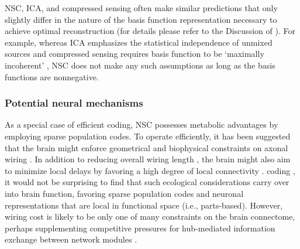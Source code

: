 \ac{NSC}, \ac{ICA}, and compressed sensing often make similar predictions
that only slightly differ in the nature of the basis function representation
necessary to achieve optimal reconstruction
(for details please refer to the Discussion of \cite{GanguliSompolinsky2012}).
For example, whereas \ac{ICA} emphasizes the statistical independence 
of unmixed sources
and compressed sensing requires basis function to be `maximally incoherent'
\cite{GanguliSompolinsky2012},
\ac{NSC} does not make any such assumptions
as long as the basis functions are nonnegative.


\subsubsection*{Potential neural mechanisms}

As a special case of efficient coding,
\ac{NSC} possesses metabolic advantages by employing
sparse population codes.
To operate efficiently, it has been suggested that the brain might enforce 
geometrical and biophysical constraints on axonal wiring 
\cite{LaughlinSejnowski2003}.
In addition to reducing overall wiring length
\cite{Cherniak1994}, the brain might also aim to minimize local delays
by favoring a high degree of local connectivity
\cite{Chklovskii2002}.
 coding \cite{Clopath2010},
it would not be surprising to find that such ecological considerations
carry over into brain function,
favoring sparse population codes and neuronal representations that are
local in functional space (i.e., parts-based).
However, wiring cost is likely to be only one of many constraints 
on the brain connectome, perhaps supplementing competitive pressures
for hub-mediated information exchange between network modules
\cite{Rubinov2015}.

